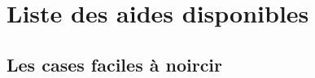 
\newcommand{\tite}{{\Huge Manuel d'aide}\\Groupe B}
\newcommand{\titrehead}{Manuel d'aide}




\chapter{Liste des aides disponibles}


\section{Les cases faciles à noircir}
	\paragraph{}
